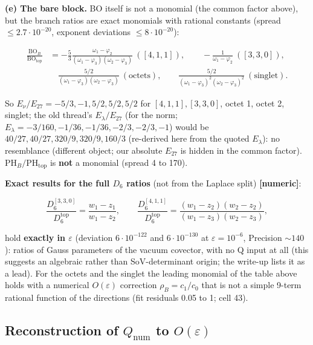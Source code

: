 \documentclass[10pt]{article}
\begin{document}
\textbf{(e) The bare block.} BO itself is not a monomial (the common factor above), but the branch ratios are exact monomials with rational constants (spread $\le2.7\cdot10^{-20}$, exponent deviations $\le8\cdot10^{-20}$):

\[\begin{aligned}
\frac{\mathrm{BO}_B}{\mathrm{BO}_{\mathrm{top}}}&=-\frac53\frac{\omega_1-\varphi_2}{(\omega_1-\varphi_3)(\omega_2-\varphi_3)}\ ([4,1,1]),\qquad -\frac{1}{\omega_1-\varphi_2}\ ([3,3,0]),\\
&\quad \frac{5/2}{(\omega_1-\varphi_3)(\omega_2-\varphi_3)}\ (\text{octets}),\qquad \frac{5/2}{(\omega_1-\varphi_3)^2(\omega_2-\varphi_3)^2}\ (\text{singlet}).
\end{aligned}\]

So $E_\nu/E_{27}=-5/3,-1,5/2,5/2,5/2$ for $[4,1,1],[3,3,0]$, octet 1, octet 2, singlet; the old thread's $E_\lambda/E_{27}$ (for the norm; $E_\lambda=-3/160,-1/36,-1/36,-2/3,-2/3,-1$) would be $40/27,40/27,320/9,320/9,160/3$ (re-derived here from the quoted $E_\lambda$): no resemblance (different object; our absolute $E_{27}$ is hidden in the common factor). $\mathrm{PH}_B/\mathrm{PH}_{\mathrm{top}}$ is \textbf{not} a monomial (spread 4 to 170).

\textbf{Exact results for the full $D_6$ ratios} (not from the Laplace split) \textbf{[numeric]}:

\[
\frac{D_6^{[3,3,0]}}{D_6^{\mathrm{top}}}=\frac{w_1-z_1}{w_1-z_2},\qquad \frac{D_6^{[4,1,1]}}{D_6^{\mathrm{top}}}=\frac{(w_1-z_2)(w_2-z_2)}{(w_1-z_3)(w_2-z_3)},
\]

hold \textbf{exactly in $\varepsilon$} (deviation $6\cdot10^{-122}$ and $6\cdot10^{-130}$ at $\varepsilon=10^{-6}$, Precision $\sim140$): ratios of Gauss parameters of the vacuum covector, with no Q input at all (this suggests an algebraic rather than SoV-determinant origin; the write-up lists it as a lead). For the octets and the singlet the leading monomial of the table above holds with a numerical $O(\varepsilon)$ correction $\rho_B=c_1/c_0$ that is not a simple 9-term rational function of the directions (fit residuals 0.05 to 1; cell 43).

\subsection{Reconstruction of $Q_{\mathrm{num}}$ to $O(\varepsilon)$}\label{sec:detsrec}
\end{document}

